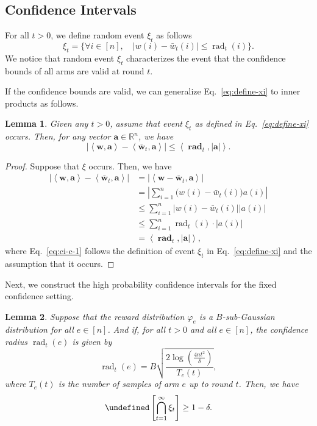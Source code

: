 \documentclass{article}
\newtheorem{lemma}{Lemma}
\newcommand{\Rew}{\varphi}
\newcommand{\RR}{\mathbb R}
\DeclareMathOperator{\rad}{rad}
\let\Pr\undefined
\DeclareMathOperator{\Pr}{Pr}
\newcommand{\inn}[1]{\left\langle #1 \right\rangle}
\renewcommand{\vec}[1]{\boldsymbol{#1}}
\begin{document}
\begin{spacing}{1.1}
\subsection{Confidence Intervals}

For all $t>0$, we define random event $\xi_t$ as follows
\begin{equation}
\xi_t = \Big\{
\forall i\in[n],\quad 
|w(i)-\bar w_t(i)| \le \rad_t(i) 
\Big\}.
\label{eq:define-xi}
\end{equation}
We notice that random event $\xi_t$ characterizes the event that the confidence bounds of all arms are valid at round $t$.

If the confidence bounds are valid, we can generalize Eq.~\eqref{eq:define-xi} to inner products as follows.
\begin{lemma}
\label{lemma:ci-property}
Given any $t>0$, assume that event $\xi_t$ as defined in Eq.~\eqref{eq:define-xi} occurs. 
Then, for any vector $\vec a \in \RR^n$, we have
$$
\big|\inn{\vec w,\vec a} - \inn{\vec {\bar w}_t, \vec a}\big| \le \inn{\vec \rad_t, |\vec a|}.
$$
\end{lemma}

\begin{proof}
Suppose that $\xi$ occurs. Then, we have
\begin{align}
\big|\inn{\vec w,\vec a} - \inn{\vec {\bar w}_t, \vec a}\big| 
&=\big|\inn{\vec w-\vec {\bar w}_t,\vec a}\big| \nonumber \\
&=\left|\sum_{i=1}^n \big(w(i)-\bar w_t(i)\big) a(i)  \right| \nonumber \\
&\le\sum_{i=1}^n \big| w(i)-\bar w_t(i)\big| |a(i)| \nonumber \\
&\le\sum_{i=1}^{n} \rad_t(i) \cdot |a(i)| \label{eq:ci-c-1}\\
&= \inn{\vec \rad_t,  |\vec a|}, \nonumber
\end{align}
where Eq.~\eqref{eq:ci-c-1} follows the definition of event $\xi_t$ in Eq.~\eqref{eq:define-xi} and the assumption that it occurs.
\end{proof}


Next, we construct the high probability confidence intervals for the fixed confidence setting.
\begin{lemma}
\label{lemma:ci}
Suppose that the reward distribution $\Rew_e$ is a $B$-sub-Gaussian distribution for all $e\in [n]$.
And if, for all $t>0$ and all $e\in [n]$, 
the confidence radius $\rad_t(e)$ is given by
$$
\rad_t(e) = B\sqrt{\frac{2\log\left(\frac{4n t^2}\delta\right)}{T_e(t)}},
$$
where $T_e(t)$ is the number of samples of arm $e$ up to round $t$.
Then, we have
$$
\Pr\left[\bigcap_{t=1}^\infty \xi_t \right] \ge 1-\delta.
$$
\end{lemma}


\end{spacing}
\end{document}
